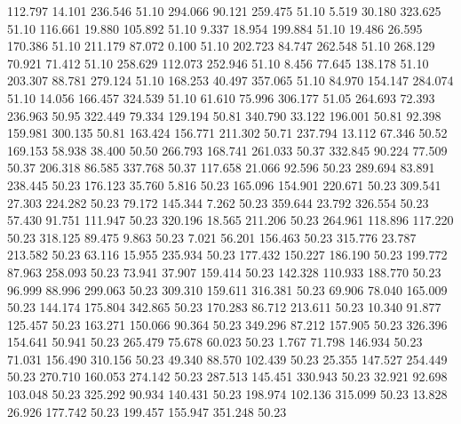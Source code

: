  112.797   14.101  236.546        51.10
 294.066   90.121  259.475        51.10
   5.519   30.180  323.625        51.10
 116.661   19.880  105.892        51.10
   9.337   18.954  199.884        51.10
  19.486   26.595  170.386        51.10
 211.179   87.072    0.100        51.10
 202.723   84.747  262.548        51.10
 268.129   70.921   71.412        51.10
 258.629  112.073  252.946        51.10
   8.456   77.645  138.178        51.10
 203.307   88.781  279.124        51.10
 168.253   40.497  357.065        51.10
  84.970  154.147  284.074        51.10
  14.056  166.457  324.539        51.10
  61.610   75.996  306.177        51.05
 264.693   72.393  236.963        50.95
 322.449   79.334  129.194        50.81
 340.790   33.122  196.001        50.81
  92.398  159.981  300.135        50.81
 163.424  156.771  211.302        50.71
 237.794   13.112   67.346        50.52
 169.153   58.938   38.400        50.50
 266.793  168.741  261.033        50.37
 332.845   90.224   77.509        50.37
 206.318   86.585  337.768        50.37
 117.658   21.066   92.596        50.23
 289.694   83.891  238.445        50.23
 176.123   35.760    5.816        50.23
 165.096  154.901  220.671        50.23
 309.541   27.303  224.282        50.23
  79.172  145.344    7.262        50.23
 359.644   23.792  326.554        50.23
  57.430   91.751  111.947        50.23
 320.196   18.565  211.206        50.23
 264.961  118.896  117.220        50.23
 318.125   89.475    9.863        50.23
   7.021   56.201  156.463        50.23
 315.776   23.787  213.582        50.23
  63.116   15.955  235.934        50.23
 177.432  150.227  186.190        50.23
 199.772   87.963  258.093        50.23
  73.941   37.907  159.414        50.23
 142.328  110.933  188.770        50.23
  96.999   88.996  299.063        50.23
 309.310  159.611  316.381        50.23
  69.906   78.040  165.009        50.23
 144.174  175.804  342.865        50.23
 170.283   86.712  213.611        50.23
  10.340   91.877  125.457        50.23
 163.271  150.066   90.364        50.23
 349.296   87.212  157.905        50.23
 326.396  154.641   50.941        50.23
 265.479   75.678   60.023        50.23
   1.767   71.798  146.934        50.23
  71.031  156.490  310.156        50.23
  49.340   88.570  102.439        50.23
  25.355  147.527  254.449        50.23
 270.710  160.053  274.142        50.23
 287.513  145.451  330.943        50.23
  32.921   92.698  103.048        50.23
 325.292   90.934  140.431        50.23
 198.974  102.136  315.099        50.23
  13.828   26.926  177.742        50.23
 199.457  155.947  351.248        50.23
